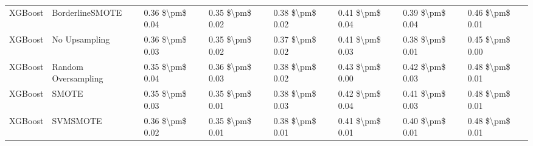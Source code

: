 \begin{tabular}{llllllll}
                        XGBoost &               BorderlineSMOTE & 0.36 \$\textbackslash pm\$ 0.04 &           0.35 \$\textbackslash pm\$ 0.02 &       0.38 \$\textbackslash pm\$ 0.02 &        0.41 \$\textbackslash pm\$ 0.04 &                         0.39 \$\textbackslash pm\$ 0.04 &     0.46 \$\textbackslash pm\$ 0.01 \\
                        XGBoost &                 No Upsampling & 0.36 \$\textbackslash pm\$ 0.03 &           0.35 \$\textbackslash pm\$ 0.02 &       0.37 \$\textbackslash pm\$ 0.02 &        0.41 \$\textbackslash pm\$ 0.03 &                         0.38 \$\textbackslash pm\$ 0.01 &     0.45 \$\textbackslash pm\$ 0.00 \\
                        XGBoost &           Random Oversampling & 0.35 \$\textbackslash pm\$ 0.04 &           0.36 \$\textbackslash pm\$ 0.03 &       0.38 \$\textbackslash pm\$ 0.02 &        0.43 \$\textbackslash pm\$ 0.00 &                         0.42 \$\textbackslash pm\$ 0.03 &     0.48 \$\textbackslash pm\$ 0.01 \\
                        XGBoost &                         SMOTE & 0.35 \$\textbackslash pm\$ 0.03 &           0.35 \$\textbackslash pm\$ 0.01 &       0.38 \$\textbackslash pm\$ 0.03 &        0.42 \$\textbackslash pm\$ 0.04 &                         0.41 \$\textbackslash pm\$ 0.03 &     0.48 \$\textbackslash pm\$ 0.01 \\
                        XGBoost &                      SVMSMOTE & 0.36 \$\textbackslash pm\$ 0.02 &           0.35 \$\textbackslash pm\$ 0.01 &       0.38 \$\textbackslash pm\$ 0.01 &        0.41 \$\textbackslash pm\$ 0.01 &                         0.40 \$\textbackslash pm\$ 0.01 &     0.48 \$\textbackslash pm\$ 0.01 \\
\bottomrule
\end{tabular}

